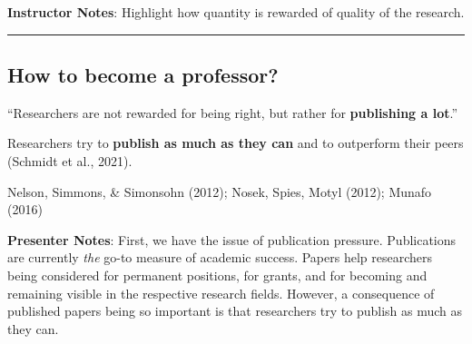 \documentclass[
  english,
  letterpaper,
  DIV=11,
  numbers=noendperiod]{scrartcl}
\begin{document}
\textbf{Instructor Notes}: Highlight how quantity is rewarded of quality
of the research.

\begin{center}\rule{0.5\linewidth}{0.5pt}\end{center}

\subsection{How to become a
professor?}\label{how-to-become-a-professor-1}

\begin{tcolorbox}[enhanced jigsaw, arc=.35mm, bottomrule=.15mm, bottomtitle=1mm, breakable, colback=white, colbacktitle=quarto-callout-important-color!10!white, colframe=quarto-callout-important-color-frame, coltitle=black, left=2mm, leftrule=.75mm, opacityback=0, opacitybacktitle=0.6, rightrule=.15mm, title=\textcolor{quarto-callout-important-color}{\faExclamation}\hspace{0.5em}{Publication Pressure}, titlerule=0mm, toprule=.15mm, toptitle=1mm]

``Researchers are not rewarded for being right, but rather for
\textbf{publishing a lot}.''

\end{tcolorbox}

\begin{tcolorbox}[enhanced jigsaw, arc=.35mm, bottomrule=.15mm, bottomtitle=1mm, breakable, colback=white, colbacktitle=quarto-callout-warning-color!10!white, colframe=quarto-callout-warning-color-frame, coltitle=black, left=2mm, leftrule=.75mm, opacityback=0, opacitybacktitle=0.6, rightrule=.15mm, title=\textcolor{quarto-callout-warning-color}{\faExclamationTriangle}\hspace{0.5em}{Consequence: ``Publish or Perish'' culture}, titlerule=0mm, toprule=.15mm, toptitle=1mm]

Researchers try to \textbf{publish as much as they can} and to
outperform their peers (Schmidt et al., 2021).

\end{tcolorbox}

Nelson, Simmons, \& Simonsohn (2012); Nosek, Spies, Motyl (2012); Munafo
(2016)

\textbf{Presenter Notes}: First, we have the issue of publication
pressure. Publications are currently \emph{the} go-to measure of
academic success. Papers help researchers being considered for permanent
positions, for grants, and for becoming and remaining visible in the
respective research fields. However, a consequence of published papers
being so important is that researchers try to publish as much as they
can.
\end{document}
